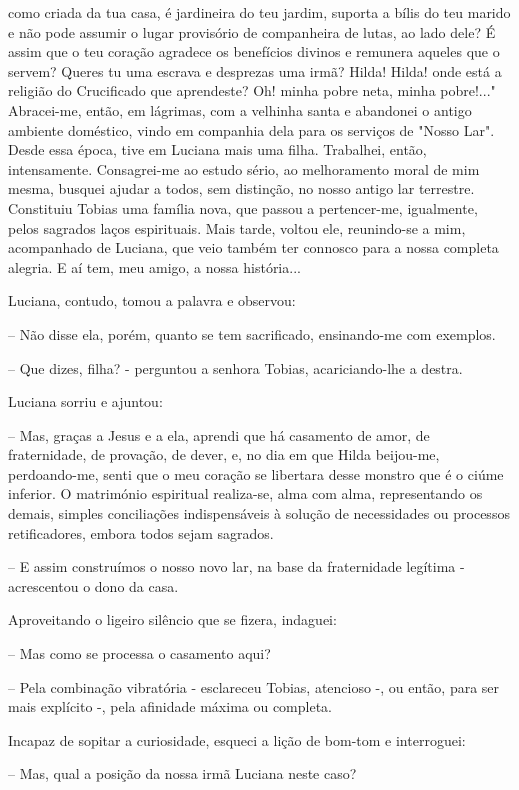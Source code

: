 \documentclass[portuguese,12pt,a4paper]{scrbook}
\begin{document}
	
	como criada da tua casa, é jardineira do teu jardim, suporta a bílis do teu marido e não pode assumir o lugar provisório de companheira de lutas, ao lado dele? É assim que o teu coração agradece os benefícios divinos e remunera aqueles que o servem? Queres tu uma escrava e desprezas uma irmã? Hilda! Hilda! onde está a religião do Crucificado que aprendeste? Oh! minha pobre neta, minha pobre!..." Abracei-me, então, em lágrimas, com a velhinha santa e abandonei o antigo ambiente doméstico, vindo em companhia dela para os serviços de "Nosso Lar". Desde essa época, tive em Luciana mais uma filha. Trabalhei, então, intensamente. Consagrei-me ao estudo sério, ao melhoramento moral de mim mesma, busquei ajudar a todos, sem distinção, no nosso antigo lar terrestre. Constituiu Tobias uma família nova, que passou a pertencer-me, igualmente, pelos sagrados laços espirituais. Mais tarde, voltou ele, reunindo-se a mim, acompanhado de Luciana, que veio também ter connosco para a nossa completa alegria. E aí tem, meu amigo, a nossa história...
	
	Luciana, contudo, tomou a palavra e observou:
	
	– Não disse ela, porém, quanto se tem sacrificado, ensinando-me com exemplos.
	
	– Que dizes, filha? - perguntou a senhora Tobias, acariciando-lhe a destra.
	
	Luciana sorriu e ajuntou:
	
	– Mas, graças a Jesus e a ela, aprendi que há casamento de amor, de fraternidade, de provação, de dever, e, no dia em que Hilda beijou-me, perdoando-me, senti que o meu coração se libertara desse monstro que é o ciúme inferior. O matrimónio espiritual realiza-se, alma com alma, representando os demais, simples conciliações indispensáveis à solução de necessidades ou processos retificadores, embora todos sejam sagrados.
	
	
	– E assim construímos o nosso novo lar, na base da fraternidade legítima - acrescentou o dono da casa.
	
	Aproveitando o ligeiro silêncio que se fizera, indaguei:
	
	– Mas como se processa o casamento aqui?
	
	– Pela combinação vibratória - esclareceu Tobias, atencioso -, ou então, para ser mais explícito -, pela afinidade máxima ou completa.
	
	Incapaz de sopitar a curiosidade, esqueci a lição de bom-tom e interroguei:
	
	– Mas, qual a posição da nossa irmã Luciana neste caso?
	
\end{document}
